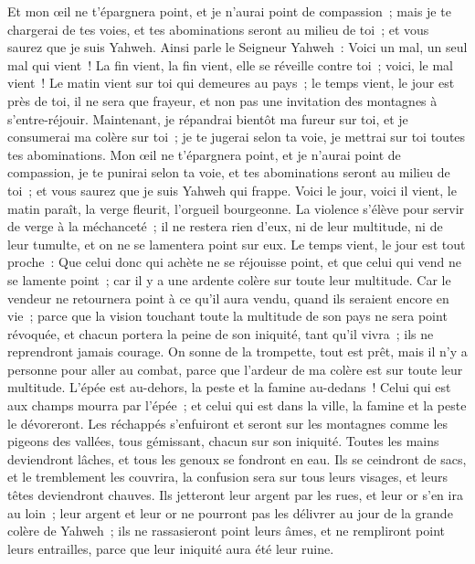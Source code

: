 \begin{multicols}{2}
Et mon œil ne t'épargnera point, et je n'aurai point de compassion~; mais je te chargerai de tes voies, et tes abominations seront au milieu de toi~; et vous saurez que je suis Yahweh.
Ainsi parle le Seigneur Yahweh~: Voici un mal, un seul mal qui vient~!
La fin vient, la fin vient, elle se réveille contre toi~; voici, le mal vient~!
Le matin vient sur toi qui demeures au pays~; le temps vient, le jour est près de toi, il ne sera que frayeur, et non pas une invitation des montagnes à s'entre-réjouir.
Maintenant, je répandrai bientôt ma fureur sur toi, et je consumerai ma colère sur toi~; je te jugerai selon ta voie, je mettrai sur toi toutes tes abominations.
Mon œil ne t'épargnera point, et je n'aurai point de compassion, je te punirai selon ta voie, et tes abominations seront au milieu de toi~; et vous saurez que je suis Yahweh qui frappe.
Voici le jour, voici il vient, le matin paraît, la verge fleurit, l'orgueil bourgeonne.
La violence s'élève pour servir de verge à la méchanceté~; il ne restera rien d'eux, ni de leur multitude, ni de leur tumulte, et on ne se lamentera point sur eux.
Le temps vient, le jour est tout proche~: Que celui donc qui achète ne se réjouisse point, et que celui qui vend ne se lamente point~; car il y a une ardente colère sur toute leur multitude.
Car le vendeur ne retournera point à ce qu'il aura vendu, quand ils seraient encore en vie~; parce que la vision touchant toute la multitude de son pays ne sera point révoquée, et chacun portera la peine de son iniquité, tant qu'il vivra~; ils ne reprendront jamais courage.
On sonne de la trompette, tout est prêt, mais il n'y a personne pour aller au combat, parce que l'ardeur de ma colère est sur toute leur multitude.
L'épée est au-dehors, la peste et la famine au-dedans~! Celui qui est aux champs mourra par l'épée~; et celui qui est dans la ville, la famine et la peste le dévoreront.
Les réchappés s'enfuiront et seront sur les montagnes comme les pigeons des vallées, tous gémissant, chacun sur son iniquité.
Toutes les mains deviendront lâches, et tous les genoux se fondront en eau.
Ils se ceindront de sacs, et le tremblement les couvrira, la confusion sera sur tous leurs visages, et leurs têtes deviendront chauves.
Ils jetteront leur argent par les rues, et leur or s'en ira au loin~; leur argent et leur or ne pourront pas les délivrer au jour de la grande colère de Yahweh~; ils ne rassasieront point leurs âmes, et ne rempliront point leurs entrailles, parce que leur iniquité aura été leur ruine.

\end{multicols}
